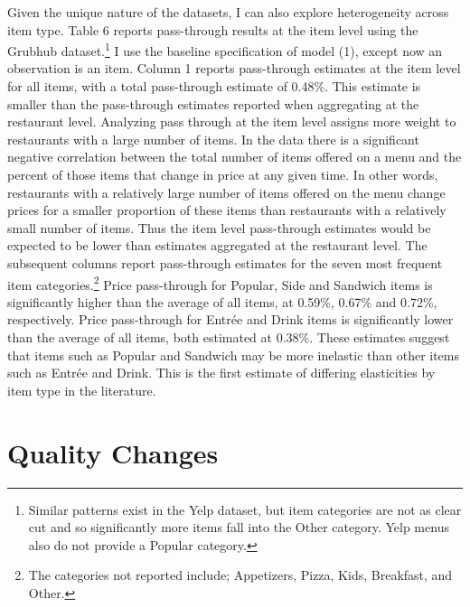 \documentclass[11pt]{article}
\begin{document}
Given the unique nature of the datasets, I can also explore heterogeneity across item type. Table 6 reports pass-through results at the item level using the Grubhub dataset.\footnote{Similar patterns exist in the Yelp dataset, but item categories are not as clear cut and so significantly more items fall into the Other category. Yelp menus also do not provide a Popular category.} I use the baseline specification of model (1), except now an observation is an item. Column 1 reports pass-through estimates at the item level for all items, with a total pass-through estimate of 0.48\%. This estimate is smaller than the pass-through estimates reported when aggregating at the restaurant level. Analyzing pass through at the item level assigns more weight to restaurants with a large number of items. In the data there is a significant negative correlation between the total number of items offered on a menu and the percent of those items that change in price at any given time. In other words, restaurants with a relatively large number of items offered on the menu change prices for a smaller proportion of these items than restaurants with a relatively small number of items. Thus the item level pass-through estimates would be expected to be lower than estimates aggregated at the restaurant level. The subsequent columns report pass-through estimates for the seven most frequent item categories.\footnote{The categories not reported include; Appetizers, Pizza, Kids, Breakfast, and Other.} Price pass-through for Popular, Side and Sandwich items is significantly higher than the average of all items, at 0.59\%, 0.67\% and 0.72\%, respectively. Price pass-through for Entr\'ee and Drink items is significantly lower than the average of all items, both estimated at 0.38\%. These estimates suggest that items such as Popular and Sandwich may be more inelastic than other items such as Entr\'ee and Drink. This is the first estimate of differing elasticities by item type in the literature. 




\section{Quality Changes}
\end{document}
